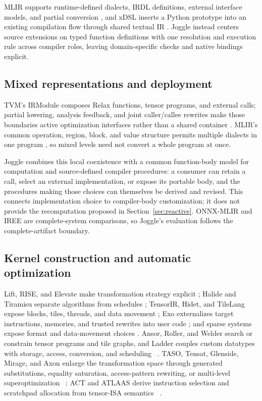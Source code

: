 \documentclass[sigplan,anonymous,review]{acmart}
\begin{document}
MLIR supports runtime-defined dialects, IRDL definitions, external interface
models, and partial conversion
\cite{mlirDynamicDialectDocs,mlirIrdlDocs,mlirInterfacesDocs,mlirConversionDocs},
and xDSL inserts a Python prototype into an existing compilation flow through
shared textual IR \cite{fehr2023xdsl}. Joggle instead centers source extensions
on typed function definitions with one resolution and execution rule across
compiler roles, leaving domain-specific checks and native bindings explicit.

\subsection{Mixed representations and deployment}
TVM's IRModule composes Relax functions, tensor programs, and external calls;
partial lowering, analysis feedback, and joint caller/callee rewrites make those
boundaries active optimization interfaces rather than a shared container
\cite{lai2025relax,tvmArchitectureDocs}. MLIR's common operation, region, block,
and value structure permits multiple dialects in one program
\cite{lattner2021mlir,mlirLangRefDocs,mlirConversionDocs}, so mixed levels need
not convert a whole program at once.

Joggle combines this local coexistence with a common function-body model for
computation and source-defined compiler procedures: a consumer can retain a
call, select an external implementation, or expose its portable body, and the
procedures making those choices can themselves be derived and revised. This
connects implementation choice to compiler-body customization; it does not
provide the recomputation proposed in Section~\ref{sec:reactive}.
ONNX-MLIR \cite{jin2020onnxmlir} and IREE \cite{ireeDocs} are complete-system
comparisons, so Joggle's evaluation follows the complete-artifact boundary.

\subsection{Kernel construction and automatic optimization}
Lift, RISE, and Elevate make transformation strategy explicit
\cite{steuwer2017lift,steuwer2022rise}; Halide and Tiramisu separate algorithms
from schedules \cite{ragankelley2013halide,baghdadi2019tiramisu}; TensorIR,
Hidet, and TileLang expose blocks, tiles, threads, and data movement
\cite{feng2023tensorir,ding2023hidet,wang2025tilelang}; Exo externalizes target
instructions, memories, and trusted rewrites into user code
\cite{ikarashi2022exo}; and sparse systems expose format and data-movement
choices \cite{daghero2025sparse}. Ansor, Roller, and Welder search or constrain
tensor programs and tile graphs, and Ladder couples custom datatypes with
storage, access, conversion, and scheduling
~\cite{zheng2020ansor,zhu2022roller,shi2023welder,wang2024ladder}. TASO,
Tensat, Glenside, Mirage, and Axon enlarge the transformation space through
generated substitutions, equality saturation, access-pattern rewriting, or
multi-level superoptimization
~\cite{jia2019taso,yang2021tensat,smith2021glenside,wu2024mirage,kothari2026axon};
ACT and ATLAAS derive instruction selection and scratchpad allocation from
tensor-ISA semantics ~\cite{jain2026act,gao2026atlaas}.
\end{document}
